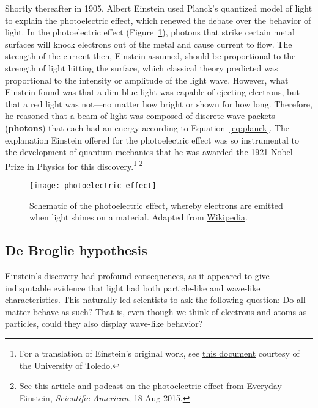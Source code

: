Shortly thereafter in 1905, Albert Einstein used Planck's quantized model of light to explain the photoelectric effect, which renewed the debate over the behavior of light. In the photoelectric effect (Figure~\ref{fig:PE-eff}), photons that strike certain metal surfaces will knock electrons out of the metal and cause current to flow. The strength of the current then, Einstein assumed, should be proportional to the strength of light hitting the surface, which classical theory predicted was proportional to the intensity or amplitude of the light wave. However, what Einstein found was that a dim blue light was capable of ejecting electrons, but that a red light was not---no matter how bright or shown for how long. Therefore, he reasoned that a beam of light was composed of discrete wave packets (\textbf{photons}) that each had an energy according to Equation~\ref{eq:planck}. The explanation Einstein offered for the photoelectric effect was so instrumental to the development of quantum mechanics that he was awarded the 1921 Nobel Prize in Physics for this discovery.\footnote{For a translation of Einstein's original work, see \href{http://astro1.panet.utoledo.edu/~ljc/PE\_eng.pdf}{this document} courtesy of the University of Toledo.}$^,$\footnote{See \href{https://www.scientificamerican.com/article/einstein-s-legacy-the-photoelectric-effect/}{this article and podcast} on the photoelectric effect from Everyday Einstein, \emph{Scientific American}, 18 Aug 2015.}
\begin{figure}[!h]
	\centering
	\texttt{[image: photoelectric-effect]}
	\caption{Schematic of the photoelectric effect, whereby electrons are emitted when light shines on a material. Adapted from \href{https://en.wikipedia.org/wiki/Photoelectric\_effect}{Wikipedia}.}
	\label{fig:PE-eff}
\end{figure}


\subsection{De Broglie hypothesis} \label{sec:db-hyp}
Einstein's discovery had profound consequences, as it appeared to give indisputable evidence that light had both particle-like and wave-like characteristics. This naturally led scientists to ask the following question: Do all matter behave as such? That is, even though we think of electrons and atoms as particles, could they also display wave-like behavior? \par


